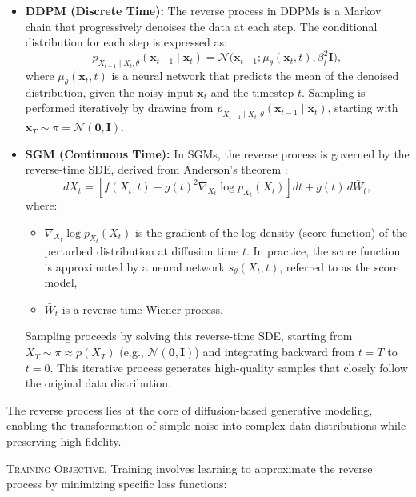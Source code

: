 \begin{itemize}
    \item \textbf{DDPM (Discrete Time):}
    The reverse process in DDPMs is a Markov chain that progressively denoises the data at each step. The conditional distribution for each step is expressed as:
    \[
    p_{X_{t-1} \mid X_t, \theta}(\mathbf{x}_{t-1} \mid \mathbf{x}_t) = \mathcal{N}\bigl(\mathbf{x}_{t-1}; \mu_\theta(\mathbf{x}_t, t), \beta_t^2 \mathbf{I}\bigr),
    \]
    where \( \mu_\theta(\mathbf{x}_t, t) \) is a neural network that predicts the mean of the denoised distribution, given the noisy input \( \mathbf{x}_t \) and the timestep \( t \). Sampling is performed iteratively by drawing from \( p_{X_{t-1} \mid X_t, \theta}(\mathbf{x}_{t-1} \mid \mathbf{x}_t) \), starting with \( \mathbf{x}_T \sim \pi = \mathcal{N}(\mathbf{0}, \mathbf{I}) \).
    \item \textbf{SGM (Continuous Time):}
    In SGMs, the reverse process is governed by the reverse-time SDE, derived from Anderson’s theorem \cite{anderson1982reverse_time_sde}:
    \[
    dX_t = \left[f(X_t, t) - g(t)^2 \nabla_{X_t} \log p_{X_t}(X_t)\right] dt + g(t) \, d\bar{W}_t,
    \]
    where:
    \begin{itemize}
        \item \( \nabla_{X_t} \log p_{X_t}(X_t) \) is the gradient of the log density (score function) of the perturbed distribution at diffusion time \( t \). In practice, the score function is approximated by a neural network \( s_\theta(X_t, t) \), referred to as the score model,
        \item \( \bar{W}_t \) is a reverse-time Wiener process.
    \end{itemize}

    Sampling proceeds by solving this reverse-time SDE, starting from \( X_T \sim \pi \approx p(X_T) \) (e.g., \( \mathcal{N}(\mathbf{0}, \mathbf{I}) \)) and integrating backward from \( t = T \) to \( t = 0 \). This iterative process generates high-quality samples that closely follow the original data distribution.

\end{itemize}

The reverse process lies at the core of diffusion-based generative modeling, enabling the transformation of simple noise into complex data distributions while preserving high fidelity.


\textsc{Training Objective.} Training involves learning to approximate the reverse process by minimizing specific loss functions:

